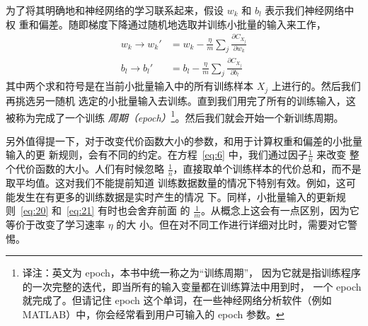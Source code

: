 为了将其明确地和神经网络的学习联系起来，假设 $w_k$ 和 $b_l$ 表示我们神经网络中权
重和偏差。随即梯度下降通过随机地选取并训练小批量的输入来工作，
\begin{align}
  \label{eq:20}w_k \rightarrow w_k' &= w_k-\frac{\eta}{m}
                                      \sum_j \frac{\partial C_{X_j}}{\partial w_k}
                                      \tag{20}\\
  \label{eq:21}b_l \rightarrow b_l' &= b_l-\frac{\eta}{m}
                                      \sum_j \frac{\partial C_{X_j}}{\partial b_l}
                                      \tag{21}
\end{align}
其中两个求和符号是在当前小批量输入中的所有训练样本 $X_j$ 上进行的。然后我们再挑选另一随机
选定的小批量输入去训练。直到我们用完了所有的训练输入，这被称为完成了一个训练%
\emph{周期（epoch）}\footnote{译注：英文为 epoch，本书中统一称之为``训练周期''，
  因为它就是指训练程序的一次完整的迭代，即当所有的输入变量都在训练算法中用到时，
  一个 epoch 就完成了。但请记住 epoch 这个单词，在一些神经网络分析软件（例如
    MATLAB）中，你会经常看到用户可输入的 epoch 参数。
}。然后我们就会开始一个新训练周期。

%
%
%
%
%

另外值得提一下，对于改变代价函数大小的参数，和用于计算权重和偏差的小批量输入的更
新规则，会有不同的约定。在方程~\eqref{eq:6} 中，我们通过因子$\frac{1}{n}$ 来改变
整个代价函数的大小。人们有时候忽略
$\frac{1}{n}$，直接取单个训练样本的代价总和，而不是取平均值。这对我们不能提前知道
训练数据数量的情况下特别有效。例如，这可能发生在有更多的训练数据是实时产生的情况
下。同样，小批量输入的更新规则~\eqref{eq:20} 和~\eqref{eq:21} 有时也会舍弃前面
的 $\frac{1}{m}$。从概念上这会有一点区别，因为它等价于改变了学习速率 $\eta$ 的大
小。但在对不同工作进行详细对比时，需要对它警惕。

